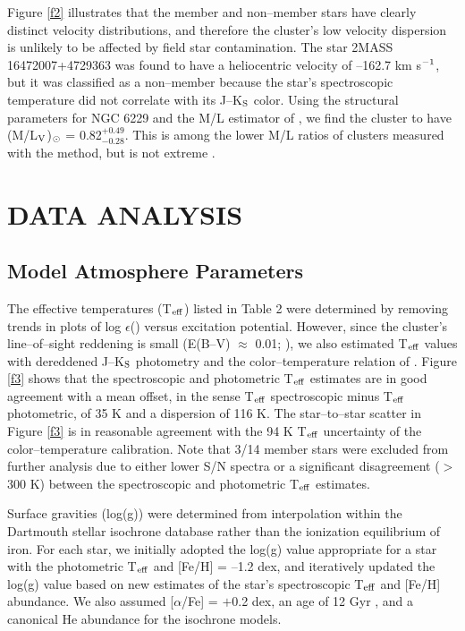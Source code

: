 \documentclass[12pt,preprint]{emulateapj}
\begin{document}
Figure \ref{f2} illustrates that the member and non--member stars have clearly
distinct velocity distributions, and therefore the cluster's low velocity
dispersion is unlikely to be affected by field star contamination.  The star
2MASS 16472007+4729363 was found to have a heliocentric velocity of --162.7 km
s$^{\rm -1}$, but it was classified as a non--member because the star's 
spectroscopic temperature did not correlate with its J--K$_{\rm S}$ color.  
Using the \citet{McLaughlin05} structural parameters for NGC 
6229 and the M/L estimator of \citet{Strader09}, we find the cluster to 
have (M/L$_{\rm V}$)$_{\rm \odot}$ = 0.82$_{-0.28}^{+0.49}$.  This is among the
lower M/L ratios of clusters measured with the \citet{Strader09} method,
but is not extreme \citep[e.g.,][]{Strader11}.

\section{DATA ANALYSIS}

\subsection{Model Atmosphere Parameters}

The effective temperatures (T$_{\rm eff}$) listed in Table 2 were determined
by removing trends in plots of log $\epsilon$() versus excitation
potential.  However, since the cluster's line--of--sight reddening is small
(E(B--V) $\approx$ 0.01; \citealt{Zinn80}), we also estimated T$_{\rm eff}$ 
values with dereddened J--K$_{\rm S}$ photometry and the color--temperature 
relation of \citet{GHB09}.  Figure \ref{f3} shows that the spectroscopic and 
photometric T$_{\rm eff}$ estimates are in good agreement with a mean offset, 
in the sense T$_{\rm eff}$ spectroscopic minus T$_{\rm eff}$ photometric, of 
35 K and a dispersion of 116 K.  The star--to--star scatter in Figure \ref{f3} 
is in reasonable agreement with the 94 K T$_{\rm eff}$ uncertainty of the 
color--temperature calibration.  Note that 3/14 member stars were excluded 
from further analysis due to either lower S/N spectra or a significant 
disagreement ($>$ 300 K) between the spectroscopic and photometric 
T$_{\rm eff}$ estimates.

Surface gravities (log(g)) were determined from interpolation within the 
Dartmouth stellar isochrone database \citep{Dotter08} rather than the 
ionization equilibrium of iron.  For each star, we initially adopted the 
log(g) value appropriate for a star with the photometric T$_{\rm eff}$ and 
[Fe/H] = --1.2 dex, and iteratively updated the log(g) value based on new 
estimates of the star's spectroscopic T$_{\rm eff}$ and [Fe/H] abundance.  We 
also assumed [$\alpha$/Fe] = $+$0.2 dex, an age of 12 Gyr \citep{Arellano15}, 
and a canonical He abundance for the isochrone models.
\end{document}
